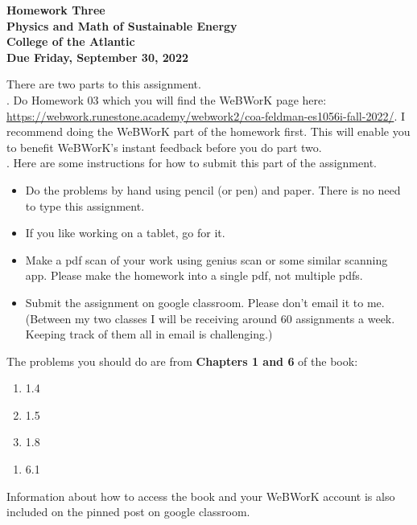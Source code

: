 \documentclass[12pt]{article}
\begin{document}
\pagestyle{empty}
 
\begin{center}
{\LARGE {\bf Homework Three}}\\
\bigskip
{\Large {\bf Physics and Math of Sustainable Energy}}\\
\bigskip
{\Large {\bf College of the Atlantic}}\\
\bigskip
{ {\bf Due Friday, September 30, 2022}}\\ 
\end{center}
\medskip


\noindent There are two parts to this assignment.\\

.  Do Homework 03 which you
will find the WeBWorK page here:
\url{https://webwork.runestone.academy/webwork2/coa-feldman-es1056i-fall-2022/}.
I recommend doing the WeBWorK part of the homework first.  This will
enable you to benefit WeBWorK's instant feedback before you do part
two.\\ 


.  Here are some
instructions for how to submit this part of the assignment.
\begin{itemize}
\item Do the problems by hand using pencil (or pen) and paper.
  There is no need to type this assignment.
\item If you like working on a tablet, go for it. 
\item Make a pdf scan of your work using genius scan or some
  similar scanning app.  Please make the homework into a single
  pdf, not multiple pdfs.
\item Submit the assignment on google classroom.  Please don't
  email it to me.  (Between my two classes I will be receiving
  around 60 assignments a week.  Keeping track of them all in email 
  is challenging.)\\
\end{itemize}

\noindent The problems you should do are from {\bf Chapters 1 and 6}
of the book:  \\

\begin{enumerate}
\setlength{\itemsep}{-1mm}
\item 1.4
\item 1.5
\item 1.8\\
\end{enumerate}


\begin{enumerate}
\setlength{\itemsep}{-1mm}
\item 6.1\\
\end{enumerate}

\noindent Information about how to access the book and your WeBWorK
account is also included on the pinned post on google classroom. 
\end{document}

